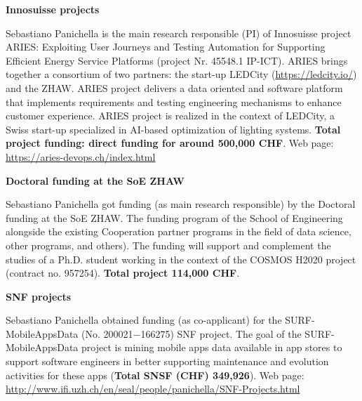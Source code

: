 \documentclass[11pt]{article}
\newcommand{\ra}{$\rightarrow$}
\newcommand{\chg}[2]{\textcolor{red}{\sout{#1}}{\ra}\textcolor{blue}{\uline{#2}}} %
\newcommand{\chg}[2]{#2}
\begin{document}
\medskip 
\textbf{Innosuisse projects}
\begin{innerlist}
   \item Sebastiano Panichella is the main research responsible (PI) of Innosuisse project ARIES: Exploiting User Journeys and Testing Automation for Supporting Efficient Energy Service Platforms (project Nr. 45548.1 IP-ICT).
ARIES brings together a consortium of two partners: the start-up LEDCity (\href{https://ledcity.io/}{https://ledcity.io/}) and the ZHAW. 
ARIES project delivers a data oriented and software platform that implements requirements and testing engineering mechanisms to enhance customer experience. ARIES project is realized in the context of LEDCity, a Swiss start-up specialized in AI-based optimization of lighting systems.
\textbf{Total project funding: direct funding for around \textbf{500,000 CHF}}. Web page: \href{https://aries-devops.ch/index.html}{https://aries-devops.ch/index.html}
\end{innerlist}
\medskip 
\textbf{Doctoral funding at the SoE ZHAW}
\begin{innerlist}
   \item Sebastiano Panichella got funding (as main research responsible) by the Doctoral funding at the SoE ZHAW.
The funding program of the School of Engineering alongside the existing Cooperation partner programs in the field of data science, other programs, and others).
The funding will support and complement the studies of a Ph.D. student working in the context of the COSMOS H2020 project (contract no. 957254).
\textbf{Total project 114,000 CHF}. 
\end{innerlist}
\medskip
\textbf{SNF projects}
\begin{innerlist}
   \item Sebastiano Panichella obtained funding  (as co-applicant) for
   the SURF-MobileAppsData  (No. 200021$-$166275) SNF project. The goal of the SURF-MobileAppsData project is mining mobile apps data available in app stores to support software engineers in better supporting maintenance and evolution activities for these apps (\textbf{Total SNSF (CHF) 349,926}). Web page: \href{http://www.ifi.uzh.ch/en/seal/people/panichella/SNF-Projects.html}{http://www.ifi.uzh.ch/en/seal/people/panichella/SNF-Projects.html}
\end{innerlist}
\end{document}
